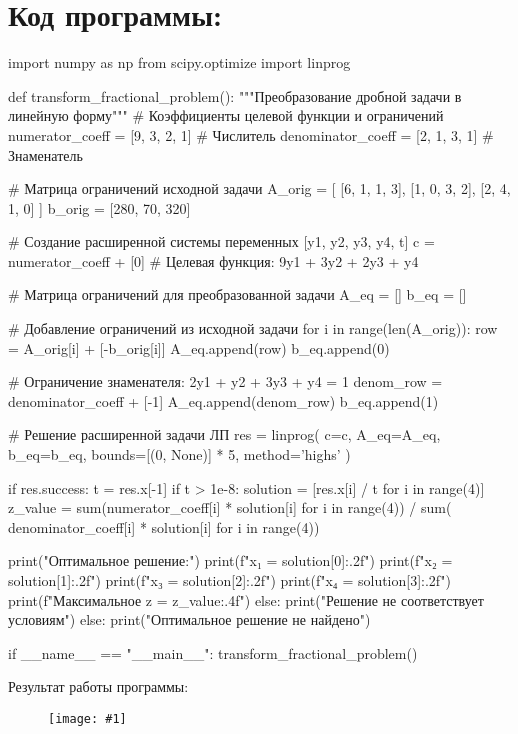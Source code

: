 \documentclass{report}
\newcommand{\drawzalupa}[2]{
	\begin{figure}[H]
		\centering
		\texttt{[image: \#1]}
	\end{figure}
}
\begin{document}
	\newpage
	
	
	
	
	\section{Код программы:}
	\begin{code}
import numpy as np
from scipy.optimize import linprog


def transform_fractional_problem():
	"""Преобразование дробной задачи в линейную форму"""
	# Коэффициенты целевой функции и ограничений
	numerator_coeff = [9, 3, 2, 1]  # Числитель
	denominator_coeff = [2, 1, 3, 1]  # Знаменатель

	# Матрица ограничений исходной задачи
	A_orig = [
		[6, 1, 1, 3],
		[1, 0, 3, 2],
		[2, 4, 1, 0]
	]
	b_orig = [280, 70, 320]

	# Создание расширенной системы переменных [y1, y2, y3, y4, t]
	c = numerator_coeff + [0]  # Целевая функция: 9y1 + 3y2 + 2y3 + y4

	# Матрица ограничений для преобразованной задачи
	A_eq = []
	b_eq = []

	# Добавление ограничений из исходной задачи
	for i in range(len(A_orig)):
		row = A_orig[i] + [-b_orig[i]]
		A_eq.append(row)
		b_eq.append(0)

	# Ограничение знаменателя: 2y1 + y2 + 3y3 + y4 = 1
	denom_row = denominator_coeff + [-1]
	A_eq.append(denom_row)
	b_eq.append(1)

	# Решение расширенной задачи ЛП
	res = linprog(
		c=c,
		A_eq=A_eq,
		b_eq=b_eq,
		bounds=[(0, None)] * 5,
		method='highs'
	)

	if res.success:
		t = res.x[-1]
		if t > 1e-8:
			solution = [res.x[i] / t for i in range(4)]
			z_value = sum(numerator_coeff[i] * solution[i] for i in range(4)) / sum(
				denominator_coeff[i] * solution[i] for i in range(4))

			print("Оптимальное решение:")
			print(f"x₁ = {solution[0]:.2f}")
			print(f"x₂ = {solution[1]:.2f}")
			print(f"x₃ = {solution[2]:.2f}")
			print(f"x₄ = {solution[3]:.2f}")
			print(f"Максимальное z = {z_value:.4f}")
		else:
			print("Решение не соответствует условиям")
	else:
		print("Оптимальное решение не найдено")


if __name__ == "__main__":
	transform_fractional_problem()
	\end{code}
	
	Результат работы программы:
	
	\drawzalupa{images/task1.png}{0.6}
	
\end{document}
